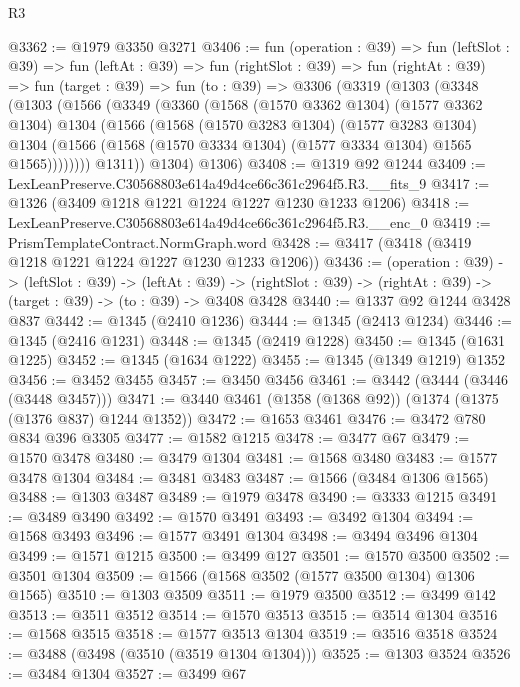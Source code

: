 \begin{lexlean}{R3}
\begin{coremodule}
@3362 := @1979 @3350 @3271
@3406 := fun (operation : @39) =>
  fun (leftSlot : @39) =>
  fun (leftAt : @39) =>
  fun (rightSlot : @39) =>
  fun (rightAt : @39) =>
  fun (target : @39) =>
  fun (to : @39) =>
  @3306
    (@3319
      (@1303
        (@3348
          (@1303
            (@1566
              (@3349
                (@3360
                  (@1568
                    (@1570 @3362 @1304)
                    (@1577 @3362 @1304)
                    @1304
                    (@1566
                      (@1568
                        (@1570 @3283 @1304)
                        (@1577 @3283 @1304)
                        @1304
                        (@1566 (@1568 (@1570 @3334 @1304) (@1577 @3334 @1304) @1565 @1565))))))))
            @1311))
        @1304)
      @1306)
@3408 := @1319 @92 @1244
@3409 := LexLeanPreserve.C30568803e614a49d4ce66c361c2964f5.R3.__fits_9
@3417 := @1326 (@3409 @1218 @1221 @1224 @1227 @1230 @1233 @1206)
@3418 := LexLeanPreserve.C30568803e614a49d4ce66c361c2964f5.R3.__enc_0
@3419 := PrismTemplateContract.NormGraph.word
@3428 := @3417 (@3418 (@3419 @1218 @1221 @1224 @1227 @1230 @1233 @1206))
@3436 := (operation : @39) ->
  (leftSlot : @39) ->
  (leftAt : @39) ->
  (rightSlot : @39) -> (rightAt : @39) -> (target : @39) -> (to : @39) -> @3408 @3428
@3440 := @1337 @92 @1244 @3428 @837
@3442 := @1345 (@2410 @1236)
@3444 := @1345 (@2413 @1234)
@3446 := @1345 (@2416 @1231)
@3448 := @1345 (@2419 @1228)
@3450 := @1345 (@1631 @1225)
@3452 := @1345 (@1634 @1222)
@3455 := @1345 (@1349 @1219) @1352
@3456 := @3452 @3455
@3457 := @3450 @3456
@3461 := @3442 (@3444 (@3446 (@3448 @3457)))
@3471 := @3440 @3461 (@1358 (@1368 @92)) (@1374 (@1375 (@1376 @837) @1244 @1352))
@3472 := @1653 @3461
@3476 := @3472 @780 @834 @396 @3305
@3477 := @1582 @1215
@3478 := @3477 @67
@3479 := @1570 @3478
@3480 := @3479 @1304
@3481 := @1568 @3480
@3483 := @1577 @3478 @1304
@3484 := @3481 @3483
@3487 := @1566 (@3484 @1306 @1565)
@3488 := @1303 @3487
@3489 := @1979 @3478
@3490 := @3333 @1215
@3491 := @3489 @3490
@3492 := @1570 @3491
@3493 := @3492 @1304
@3494 := @1568 @3493
@3496 := @1577 @3491 @1304
@3498 := @3494 @3496 @1304
@3499 := @1571 @1215
@3500 := @3499 @127
@3501 := @1570 @3500
@3502 := @3501 @1304
@3509 := @1566 (@1568 @3502 (@1577 @3500 @1304) @1306 @1565)
@3510 := @1303 @3509
@3511 := @1979 @3500
@3512 := @3499 @142
@3513 := @3511 @3512
@3514 := @1570 @3513
@3515 := @3514 @1304
@3516 := @1568 @3515
@3518 := @1577 @3513 @1304
@3519 := @3516 @3518
@3524 := @3488 (@3498 (@3510 (@3519 @1304 @1304)))
@3525 := @1303 @3524
@3526 := @3484 @1304
@3527 := @3499 @67

\end{coremodule}
\end{lexlean}
